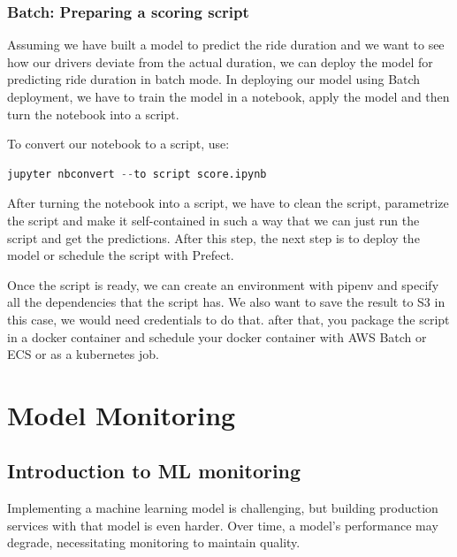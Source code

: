 \documentclass[letterpaper,12pt,notitlepage,twoside]{report}
\begin{document}
\subsection{Batch: Preparing a scoring script}
Assuming we have built a model to predict the ride duration and we want to see how our drivers deviate from the actual duration, we can deploy the model for predicting ride duration in batch mode. In deploying our model using Batch deployment, we have to train the model in a notebook, apply the model and then turn the notebook into a script.

To convert our  notebook to a script, use: 
\begin{lstlisting}[language=python, numbers=none]
jupyter nbconvert --to script score.ipynb
\end{lstlisting}

After turning the notebook into a script, we have to clean the script, parametrize the script and make it self-contained in such a way that we can just run the script and get the predictions.  After this step, the next step is to deploy the model or schedule the script with Prefect.

Once the script is ready, we can create an environment with pipenv and specify all the dependencies that the script has. We also want to save the result to S3 in this case, we would need credentials to do that.  after that, you package the script in a docker container and schedule your docker container with AWS Batch or ECS or as a kubernetes job.


\chapter{Model Monitoring} \label{ch:5}

\section{Introduction to ML monitoring}

 \begin{funfact}[frametitle=\facttitlep{Fun Fact}{Challenges in ML Model Deployment}]
Implementing a machine learning model is challenging, but building production services with that model is even harder. Over time, a model's performance may degrade, necessitating monitoring to maintain quality.
\end{funfact}
\end{document}

